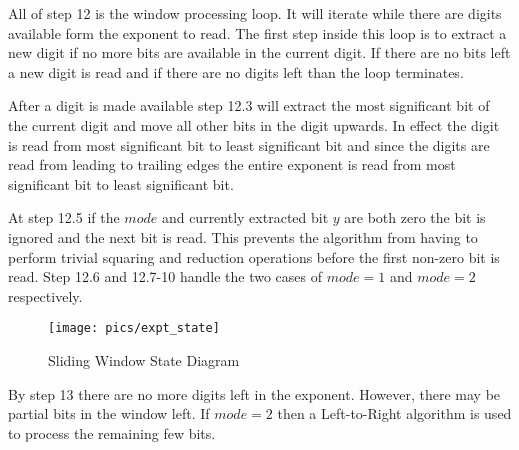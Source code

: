 \documentclass[b5paper]{book}
\begin{document}
All of step 12 is the window processing loop.  It will iterate while there are digits available form the exponent to read.  The first step
inside this loop is to extract a new digit if no more bits are available in the current digit.  If there are no bits left a new digit is
read and if there are no digits left than the loop terminates.  

After a digit is made available step 12.3 will extract the most significant bit of the current digit and move all other bits in the digit
upwards.  In effect the digit is read from most significant bit to least significant bit and since the digits are read from leading to 
trailing edges the entire exponent is read from most significant bit to least significant bit.

At step 12.5 if the $mode$ and currently extracted bit $y$ are both zero the bit is ignored and the next bit is read.  This prevents the 
algorithm from having to perform trivial squaring and reduction operations before the first non-zero bit is read.  Step 12.6 and 12.7-10 handle
the two cases of $mode = 1$ and $mode = 2$ respectively.  

\begin{center}
\begin{figure}[here]
\texttt{[image: pics/expt\_state]}
\caption{Sliding Window State Diagram}
\label{pic:expt_state}
\end{figure}
\end{center}

By step 13 there are no more digits left in the exponent.  However, there may be partial bits in the window left.  If $mode = 2$ then 
a Left-to-Right algorithm is used to process the remaining few bits.  
\end{document}
